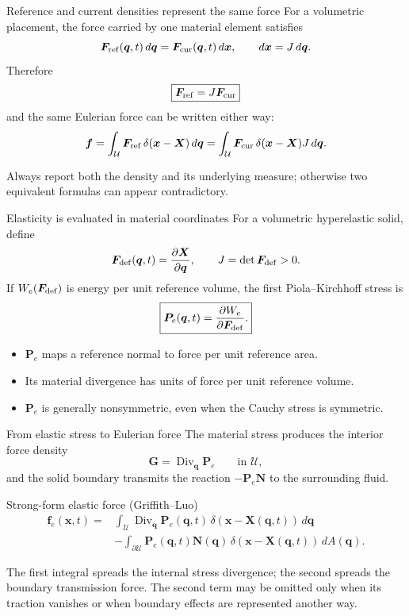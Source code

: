 \documentclass[aspectratio=169,11pt]{beamer}
\newcommand{\xvec}{\bm{x}}
\newcommand{\Xvec}{\bm{q}}
\newcommand{\chivec}{\bm{X}}
\newcommand{\fvec}{\bm{f}}
\newcommand{\Fvec}{\bm{F}}
\newcommand{\Pten}{\bm{P}_{e}}
\newcommand{\Nvec}{\bm{N}}
\begin{document}
\begin{frame}{Reference and current densities represent the same force}
For a volumetric placement, the force carried by one material element satisfies
\[
  \Fvec_{\rm ref}(\Xvec,t)\,d\Xvec
  =\Fvec_{\rm cur}(\Xvec,t)\,d\xvec,
  \qquad d\xvec=J\,d\Xvec .
\]
Therefore
\[
  \boxed{\Fvec_{\rm ref}=J\Fvec_{\rm cur}}
\]
and the same Eulerian force can be written either way:
\[
  \fvec
  =\int_{\mathcal U}\Fvec_{\rm ref}\,\delta(\xvec-\chivec)\,d\Xvec
  =\int_{\mathcal U}\Fvec_{\rm cur}\,\delta(\xvec-\chivec)J\,d\Xvec .
\]

\begin{punchbox}
Always report both the density and its underlying measure; otherwise two equivalent formulas can appear contradictory.
\end{punchbox}
\end{frame}

\begin{frame}{Elasticity is evaluated in material coordinates}
For a volumetric hyperelastic solid, define
\[
  \bm F_{\rm def}(\Xvec,t)=\frac{\partial\chivec}{\partial\Xvec},
  \qquad
  J=\det\bm F_{\rm def}>0 .
\]
If \(W_e(\bm F_{\rm def})\) is energy per unit reference volume, the first Piola--Kirchhoff stress is
\[
  \boxed{
  \Pten(\Xvec,t)
  =\frac{\partial W_e}{\partial\bm F_{\rm def}} .}
\]

\begin{itemize}\itemsep6pt
  \item \(\Pten\) maps a reference normal to force per unit reference area.
  \item Its material divergence has units of force per unit reference volume.
  \item \(\Pten\) is generally nonsymmetric, even when the Cauchy stress is symmetric.
\end{itemize}
\end{frame}

\begin{frame}{From elastic stress to Eulerian force}
The material stress produces the interior force density
\[
  \bm G=\operatorname{Div}_{\!\Xvec}\Pten
  \qquad\text{in }\mathcal U,
\]
and the solid boundary transmits the reaction \(-\Pten\Nvec\) to the surrounding fluid.

\begin{block}{Strong-form elastic force (Griffith--Luo)}
\[
\boxed{
\begin{aligned}
\fvec_e(\xvec,t)
={}&\int_{\mathcal U}
\operatorname{Div}_{\!\Xvec}\Pten(\Xvec,t)\,
\delta(\xvec-\chivec(\Xvec,t))\,d\Xvec \\
&-\int_{\partial\mathcal U}
\Pten(\Xvec,t)\Nvec(\Xvec)\,
\delta(\xvec-\chivec(\Xvec,t))\,dA(\Xvec).
\end{aligned}}
\]
\end{block}

\small The first integral spreads the internal stress divergence; the second spreads the boundary transmission force. The second term may be omitted only when its traction vanishes or when boundary effects are represented another way.
\end{frame}
\end{document}
